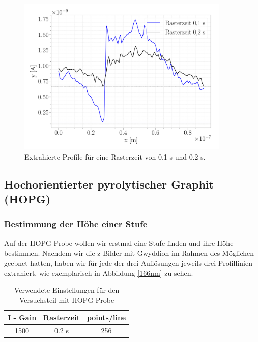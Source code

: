 \begin{figure}[H]
	\centering
	\includegraphics[width=0.9\textwidth]{../Figures/TIME_I_profiles.pdf}
	\caption{Extrahierte Profile für eine Rasterzeit von 0.1 s und 0.2 s.}
	\label{fig:rasterzeit}
\end{figure}



\subsection{Hochorientierter pyrolytischer Graphit (HOPG)}
\subsubsection{Bestimmung der Höhe einer Stufe}

Auf der HOPG Probe wollen wir erstmal eine Stufe finden und ihre Höhe bestimmen. Nachdem wir die z-Bilder mit Gwyddion im Rahmen des Möglichen geebnet hatten, haben wir für jede der drei Auflösungen jeweils drei Profillinien extrahiert, wie exemplarisch in Abbildung \ref{166nm} zu sehen.

\begin{table}[H]
	\renewcommand{\arraystretch}{1}
	\centering
	\Large
	\begin{adjustbox}{width=0.6\textwidth}
		\begin{tabular}{ccc}
			I - Gain & Rasterzeit & points/line \\
			\hline
			1500 & 0.2 s& 256 \\
		\end{tabular}
	\end{adjustbox}
	\caption{Verwendete Einstellungen für den Versuchsteil mit HOPG-Probe }
	\label{tab:HOPG-settings}
\end{table}

